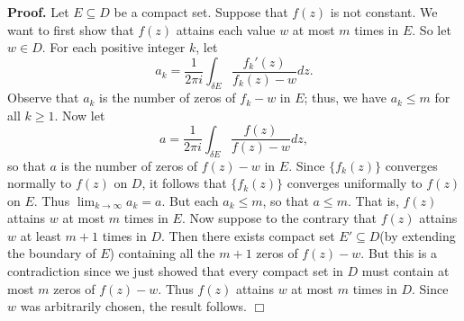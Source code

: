 \documentclass[9pt]{article}
\newcommand{\qed}{\hfill \ensuremath{\Box}}
\begin{document}
\begin{enumerate}
      \textbf{Proof.} Let $E \subseteq D$ be a compact set. Suppose that $f(z)$
      is not constant. We want to first show that $f(z)$ attains each value $w$
      at most $m$ times in $E$. So let $w \in D$. For each positive integer $k$,
      let
      $$a_k = \frac{1}{2\pi i}\int_{\delta E}\frac{f_k'(z)}{f_k(z) - w} dz.$$
      Observe that $a_k$ is the number of zeros of $f_k - w$ in $E$; thus, we
      have $a_k \le m$ for all $k \ge 1$. Now let
      $$a = \frac{1}{2\pi i}\int_{\delta E}\frac{f(z)}{f(z) - w} dz,$$
      so that $a$ is the number of zeros of $f(z) - w$ in $E$. Since
      $\{f_k(z)\}$ converges normally to $f(z)$ on $D$, it follows that
      $\{f_k(z)\}$ converges uniformally to $f(z)$ on $E$. Thus
      $\lim_{k\rightarrow\infty}a_k = a$. But each $a_k \le m$, so that
      $a \le m$. That is, $f(z)$ attains $w$ at most $m$ times in $E$. Now
      suppose to the contrary that $f(z)$ attains $w$ at least $m + 1$ times in
      $D$. Then there exists compact set $E' \subseteq D$(by extending the
      boundary of $E$) containing all the $m+1$ zeros of $f(z) - w$. But this is
      a contradiction since we just showed that every compact set in $D$ must
      contain at most $m$ zeros of $f(z) - w$. Thus $f(z)$ attains $w$ at most
      $m$ times in $D$. Since $w$ was arbitrarily chosen, the result follows.
      \qed
\end{enumerate}
\end{document}
